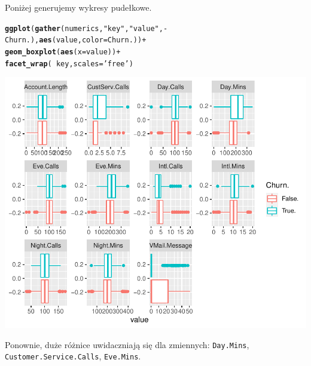 \documentclass{article}\usepackage[]{graphicx}\usepackage[]{color}
\makeatletter
\def\maxwidth{ %
  \ifdim\Gin@nat@width>\linewidth
    \linewidth
  \else
    \Gin@nat@width
  \fi
}
\newcommand{\hlstr}[1]{\textcolor[rgb]{0.192,0.494,0.8}{#1}}%
\newcommand{\hlopt}[1]{\textcolor[rgb]{0,0,0}{#1}}%
\newcommand{\hlstd}[1]{\textcolor[rgb]{0.345,0.345,0.345}{#1}}%
\newcommand{\hlkwc}[1]{\textcolor[rgb]{0.333,0.667,0.333}{#1}}%
\newcommand{\hlkwd}[1]{\textcolor[rgb]{0.737,0.353,0.396}{\textbf{#1}}}%
\newenvironment{kframe}{%
 \def\at@end@of@kframe{}%
 \ifinner\ifhmode%
  \def\at@end@of@kframe{\end{minipage}}%
  \begin{minipage}{\columnwidth}%
 \fi\fi%
 \def\FrameCommand##1{\hskip\@totalleftmargin \hskip-\fboxsep
 \colorbox{shadecolor}{##1}\hskip-\fboxsep
     \hskip-\linewidth \hskip-\@totalleftmargin \hskip\columnwidth}%
 \MakeFramed {\advance\hsize-\width
   \@totalleftmargin\z@ \linewidth\hsize
   \@setminipage}}%
 {\par\unskip\endMakeFramed%
 \at@end@of@kframe}
\newenvironment{knitrout}{}{} %
\makeatother
\begin{document}
Poniżej generujemy wykresy pudełkowe. 
\begin{knitrout}
\color{fgcolor}\begin{kframe}
\begin{alltt}
\hlkwd{ggplot}\hlstd{(}\hlkwd{gather}\hlstd{(numerics,} \hlstr{"key"}\hlstd{,} \hlstr{"value"}\hlstd{,} \hlopt{-}\hlstd{Churn.),} \hlkwd{aes}\hlstd{(value,} \hlkwc{color}\hlstd{=Churn.))} \hlopt{+}
  \hlkwd{geom_boxplot}\hlstd{(}\hlkwd{aes}\hlstd{(}\hlkwc{x}\hlstd{=value))} \hlopt{+}
  \hlkwd{facet_wrap}\hlstd{(}\hlopt{~}\hlstd{key,} \hlkwc{scales}\hlstd{=}\hlstr{'free'}\hlstd{)}
\end{alltt}
\end{kframe}

{\centering \includegraphics[width=\maxwidth]{figure/Wykresy_pudelkowe-1} 

}



\end{knitrout}
Ponownie, duże różnice uwidaczniają się dla zmiennych: \verb|Day.Mins|, \verb|Customer.Service.Calls|, \verb|Eve.Mins|.
\end{document}
